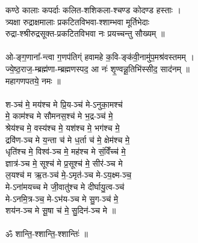 कण्ठे कालाः कपर्दाः कलित-शशिकला-श्चण्ड कोदण्ड हस्ताः ।\\
त्र्यक्षा रुद्राक्षमालाः प्रकटितविभवा-श्शाम्भवा मूर्तिभेदाः\\
रुद्रा-श्श्रीरुद्रसूक्त-प्रकटितविभवा नः प्रयच्चन्तु सौख्यम् ॥\\
\\
ओ-ङ्ग॒णाना᳚-न्त्वा ग॒णप॑तिग्ं हवामहे क॒वि-ङ्क॑वी॒नामु॑प॒मश्र॑वस्तमम् ।\\
ज्ये॒ष्ठ॒राज॒-म्ब्रह्म॑णा-म्ब्रह्मणस्पद॒ आ नः॑ शृ॒ण्वन्नू॒तिभि॑स्सीद॒ साद॑नम् ॥\\
महागणपतये॒ नमः ॥\\
\\
श-ञ्च॑ मे॒ मय॑श्च मे प्रि॒य-ञ्च॑ मे-ऽनुका॒मश्च॑ \\
मे॒ काम॑श्च मे सौमनस॒श्च॑ मे भ॒द्र-ञ्च॑ मे॒ \\
श्रेय॑श्च मे॒ वस्य॑श्च मे॒ यश॑श्च मे॒ भग॑श्च मे॒ \\
द्रवि॑ण-ञ्च मे य॒न्ता च॑ मे ध॒र्ता च॑ मे॒ क्षेम॑श्च मे॒ \\
धृति॑श्च मे॒ विश्व॑-ञ्च मे॒ मह॑श्च मे सं॒​विँच्च॑ मे॒ \\
ज्ञात्र॑-ञ्च मे॒ सूश्च॑ मे प्र॒सूश्च॑ मे॒ सीर॑-ञ्च मे \\
ल॒यश्च॑ म ऋ॒त-ञ्च॑ मे॒-ऽमृत॑-ञ्च मे-ऽय॒क्ष्म-ञ्च॒ \\
मे-ऽना॑मयच्च मे जी॒वातु॑श्च मे दीर्घायु॒त्व-ञ्च॑ \\
मे-ऽनमि॒त्र-ञ्च॒ मे-ऽभ॑य-ञ्च मे सु॒ग-ञ्च॑ मे॒ \\
शय॑न-ञ्च मे सू॒षा च॑ मे॒ सु॒दिन॑-ञ्च मे ॥\\
\\
ॐ शान्ति॒-श्शान्ति॒-श्शान्तिः॑ ॥\\
